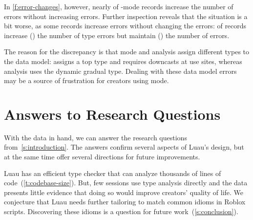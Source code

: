 \documentclass[english,submission,cleveref]{programming}
\begin{document}
In \cref{f:error-changes}, however, nearly  of \mstrict{}-mode records
increase the number of \mstrict{} errors without increasing \FS{} errors.
Further inspection reveals that the situation is a bit worse, as
some records increase \mstrict{} errors without changing the \FS{} errors:
     of \mstrict{} records increase (\addsym{}) the number of type errors
    but maintain (\keepsym{}) the number of \FS{} errors.

The reason for the discrepancy is that \mstrict{} mode and \FS{} analysis
assign different types to the data model: \mstrict{} assigns a top type
and requires downcasts at use sites, whereas \FS{} analysis uses the
dynamic gradual type.
Dealing with these data model errors may be a source of frustration
for creators using \mstrict{} mode.


\section{Answers to Research Questions}
\label{s:discussion}

With the data in hand, we can answer the research questions
from~\cref{s:introduction}.
The answers confirm several aspects of Luau's design, but
at the same time offer several directions for future improvements.

Luau has an efficient type checker that can
analyze thousands of lines of code~(\cref{t:codebase-size}).
But, few sessions use type analysis directly and the data presents little
evidence that doing so would improve creators' quality of life.
We conjecture that Luau needs further tailoring to match
common idioms in Roblox scripts.
Discovering these idioms is a question for future work~(\cref{s:conclusion}).
\end{document}
